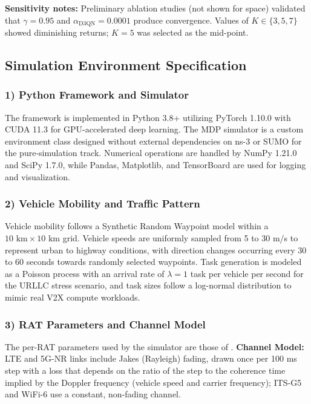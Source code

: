 \documentclass[journal,10pt,twocolumn]{IEEEtran}
\begin{document}
\textbf{Sensitivity notes:} Preliminary ablation studies (not shown for space) validated that $\gamma = 0.95$ and $\alpha_{\text{D3QN}} = 0.0001$ produce convergence. Values of $K \in \{3, 5, 7\}$ showed diminishing returns; $K = 5$ was selected as the mid-point.

\subsection{Simulation Environment Specification}

\subsubsection*{1) Python Framework and Simulator}

The framework is implemented in Python 3.8+ utilizing PyTorch 1.10.0 with CUDA 11.3 for GPU-accelerated deep learning. The MDP simulator is a custom environment class designed without external dependencies on ns-3 or SUMO for the pure-simulation track. Numerical operations are handled by NumPy 1.21.0 and SciPy 1.7.0, while Pandas, Matplotlib, and TensorBoard are used for logging and visualization.

\subsubsection*{2) Vehicle Mobility and Traffic Pattern}

Vehicle mobility follows a Synthetic Random Waypoint model within a $10 \text{ km} \times 10 \text{ km}$ grid. Vehicle speeds are uniformly sampled from 5 to 30 m/s to represent urban to highway conditions, with direction changes occurring every 30 to 60 seconds towards randomly selected waypoints. Task generation is modeled as a Poisson process with an arrival rate of $\lambda = 1$ task per vehicle per second for the URLLC stress scenario, and task sizes follow a log-normal distribution to mimic real V2X compute workloads.

\subsubsection*{3) RAT Parameters and Channel Model}

The per-RAT parameters used by the simulator are those of . \textbf{Channel Model:} LTE and 5G-NR links include Jakes (Rayleigh) fading, drawn once per 100 ms step with a loss that depends on the ratio of the step to the coherence time implied by the Doppler frequency (vehicle speed and carrier frequency); ITS-G5 and WiFi-6 use a constant, non-fading channel.
\end{document}
